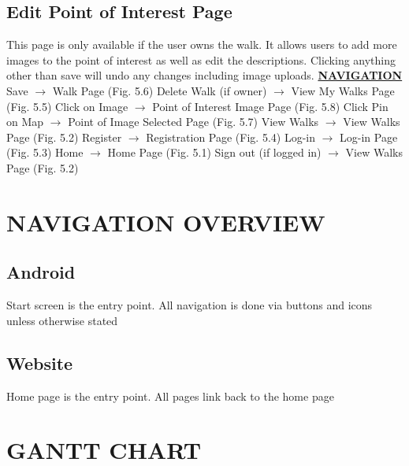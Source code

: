\documentclass[12pt]{article}
\begin{document}
\subsection{Edit Point of Interest Page}
\par{This page is only available if the user owns the walk. It allows users to add more images to
the point of interest as well as edit the descriptions. Clicking anything other than save will
undo any changes including image uploads.} \newline
\textbf{\underline{NAVIGATION}} \newline
Save $\rightarrow$ Walk Page (Fig. 5.6) \newline
Delete Walk (if owner) $\rightarrow$ View My Walks Page (Fig. 5.5) \newline
Click on Image $\rightarrow$ Point of Interest Image Page (Fig. 5.8) \newline
Click Pin on Map $\rightarrow$ Point of Image Selected Page (Fig. 5.7) \newline
View Walks $\rightarrow$ View Walks Page (Fig. 5.2) \newline
Register $\rightarrow$ Registration Page (Fig. 5.4) \newline
Log-in $\rightarrow$ Log-in Page (Fig. 5.3) \newline
Home $\rightarrow$ Home Page (Fig. 5.1) \newline
Sign out (if logged in) $\rightarrow$ View Walks Page (Fig. 5.2) \newline
\section{NAVIGATION OVERVIEW}
\subsection{Android}
\par{Start screen is the entry point. All navigation is done via buttons and icons unless otherwise
stated}
\subsection{Website}
Home page is the entry point. All pages link back to the home page
\section{GANTT CHART}
\end{document}
